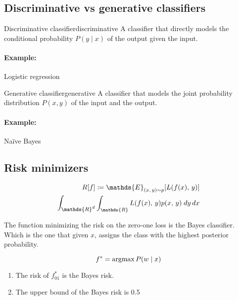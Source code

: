\subsection{Discriminative vs generative classifiers}

\begin{definition}{Discriminative classifier}{discriminative}
	A classifier that directly models the conditional probability
	\(P(y \mid x)\) of the output given the input.
  \tcblower
	\paragraph{Example:} Logistic regression
\end{definition}

\begin{definition}{Generative classifier}{generative}
	A classifier that models the joint probability distribution
	\(P(x, y)\) of the input and the output.
  \tcblower
	\paragraph{Example:} Naïve Bayes
\end{definition}

\subsection{Risk minimizers}

\begin{align*}
	R[f] \coloneqq \mathds{E}_{(x,\, y) \sim p} [ L(f(x),\, y) ] \\
  \mathlarger{\int_{\mathds{R}^d}} \int_{\mathds{R}} L(f(x),\, y) p(x,\, y)\; dy\, dx
\end{align*}

\begin{prop}{}{}

	The function minimizing the risk on the zero-one loss is the Bayes
	classifier. Which is the one that given $x$, assigns the class with the
	highest posterior probability.

	\[f^* = \operatorname{argmax} {P(w \mid x)}\]

	\begin{enumerate}
		\item The risk of \(f_{01}^*\) is the Bayes risk.
		\item The upper bound of the Bayes risk is 0.5
	\end{enumerate}

\end{prop}

